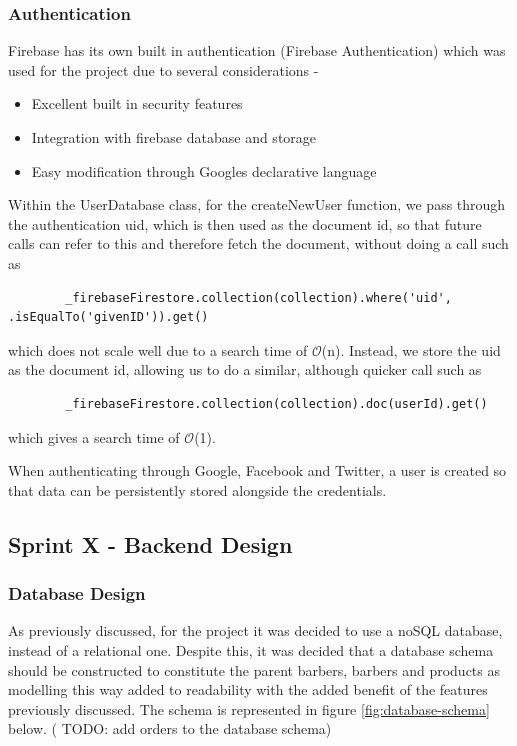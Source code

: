 \documentclass[12pt]{article}
\begin{document}
	\subsubsection{Authentication}
	\label{authentication}
	Firebase has its own built in authentication (Firebase Authentication) which was used for the project due to several considerations -
	\begin{itemize}
		\item Excellent built in security features
		\item Integration with firebase database and storage
		\item Easy modification through Googles declarative language
	\end{itemize}
	Within the UserDatabase class, for the createNewUser function, we pass through the authentication uid, which is then used as the document id, so that future calls can refer to this and therefore fetch the document, without doing a call such as 
	\begin{lstlisting}
		_firebaseFirestore.collection(collection).where('uid', .isEqualTo('givenID')).get()
	\end{lstlisting}
	which does not scale well due to a search time of $\mathcal{O}$(n). Instead, we store the uid as the document id, allowing us to do a similar, although quicker call such as
	\begin{lstlisting}
		_firebaseFirestore.collection(collection).doc(userId).get()
	\end{lstlisting}
	which gives a search time of $\mathcal{O}$(1).
	
	When authenticating through Google, Facebook and Twitter, a user is created so that data can be persistently stored alongside the credentials.
	
	
	\subsection{Sprint X - Backend Design}
	
	\subsubsection{Database Design}
	As previously discussed, for the project it was decided to use a noSQL database, instead of a relational one. Despite this, it was decided that a database schema should be constructed to constitute the parent barbers, barbers and products as modelling this way added to readability with the added benefit of the features previously discussed. The schema is represented in figure \ref{fig:database-schema} below.
	( TODO: add orders to the database schema)
	
\end{document}
